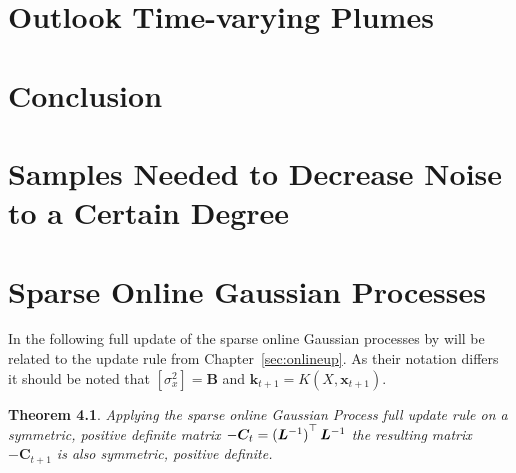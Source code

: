 \documentclass[11pt,a4paper,twoside,BCOR=15mm]{scrbook}
\newtheorem{theorem}{Theorem}
\newcommand{\vc}[1]{\bm{#1}}
\newcommand{\mat}[1]{\bm{#1}}
\newcommand{\Tr}{^{\top}}
\begin{document}
\tableofcontents


\printglossary[title={Symbols and Notation}]

\printglossary[type=\acronymtype]

\mainmatter{}







\chapter{Outlook Time-varying Plumes}

\chapter{Conclusion}

\appendix
\chapter{Samples Needed to Decrease Noise to a Certain Degree} 
\label{sec:decnoise}

\chapter{Sparse Online Gaussian Processes}\label{sec:sparse-gp-apdx}
In the following full update of the sparse online Gaussian processes by 
\textcite{Csato:2002fp} will be related to the update rule from 
Chapter~\ref{sec:onlineup}.  As their notation differs it should be noted that $[\sigma_x^2] = \mat B$ and 
$\vc k_{t+1} = K(X, {\vc x_{t+1}})$.

\begin{theorem}
Applying the sparse online Gaussian Process full update rule 
\parencite[equation~2.9]{Csato:2002fp} on a symmetric, positive definite matrix 
$-\mat C_t = \del[0]{\mat L^{-1}}\Tr \mat L^{-1}$ the resulting matrix $-\mat 
C_{t+1}$ is also symmetric, positive definite.\end{theorem}
\end{document}
